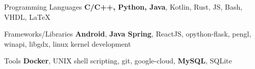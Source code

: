 

\begin{cvskills}

  \cvskill
    {Programming Languages} %
    {\textbf{C/C++, Python, Java}, Kotlin, Rust, JS, Bash, VHDL, \LaTeX} %

  \cvskill
    {Frameworks/Libraries} %
    {\textbf{Android}, \textbf{Java Spring}, ReactJS, opython-flask, pengl, winapi, libgdx, linux kernel development} %

  \cvskill
    {Tools} %
    {\textbf{Docker}, UNIX shell scripting, git, google-cloud, \textbf{MySQL}, SQLite} %

\end{cvskills}
